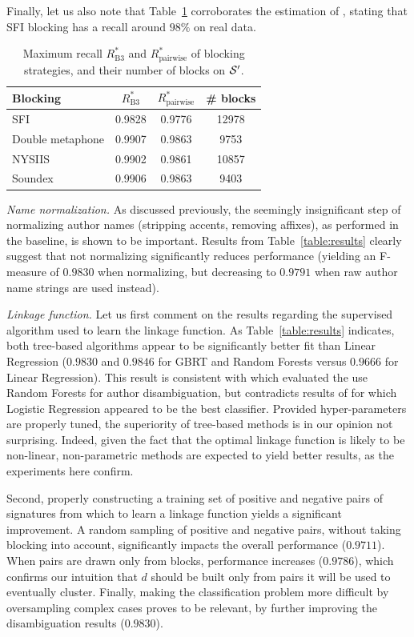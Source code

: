 \documentclass{article}
\begin{document}
Finally, let us also note that Table~\ref{table:blocking} corroborates the
estimation of \citep{torvik2009author}, stating that SFI blocking has a recall
around $98\%$ on real data.

\begin{table}
\caption{Maximum recall $R_\text{B3}^*$ and $R_\text{pairwise}^*$ of blocking strategies, and their number of blocks on ${\cal S}^\prime$.}
\label{table:blocking}
\centering
\begin{tabular}{|l|cc|c|}
  \hline
  \textbf{Blocking} & $R_\text{B3}^*$ & $R_\text{pairwise}^*$ & \# blocks \\
  \hline
  \hline
    SFI & 0.9828 & 0.9776 & 12978 \\
    Double metaphone & 0.9907 & 0.9863 & 9753 \\
    NYSIIS & 0.9902 & 0.9861 & 10857 \\
    Soundex & 0.9906 & 0.9863 & 9403 \\
  \hline
\end{tabular}
\end{table}

\textit{Name normalization.} As discussed previously, the seemingly insignificant step of
normalizing author names (stripping accents, removing affixes), as performed in the
baseline, is shown to be important. Results from Table~\ref{table:results} clearly suggest that not
normalizing significantly reduces performance (yielding an F-measure of $0.9830$ when normalizing,
but decreasing to $0.9791$ when raw author name strings are used instead).

\textit{Linkage function.} Let us first comment on the results regarding the
supervised algorithm used to learn the linkage function.
As Table~\ref{table:results} indicates, both tree-based algorithms appear to be
significantly better fit than Linear Regression ($0.9830$ and $0.9846$ for GBRT
and Random Forests versus $0.9666$ for Linear Regression). This result is
consistent with \citep{treeratpituk2009disambiguating} which evaluated the use
Random Forests for author disambiguation, but contradicts results of
\citep{levin2012citation} for which Logistic Regression appeared to be the best
classifier.
Provided hyper-parameters are properly tuned, the superiority of
tree-based methods is in our opinion not surprising.
Indeed, given the fact that the optimal linkage function is likely to be non-linear, non-parametric
methods are expected to yield better results, as the experiments here confirm.

Second, properly constructing a training set of positive and negative pairs of
signatures from which to learn a linkage function yields a significant
improvement.
A random sampling of positive and negative pairs, without taking
blocking into account, significantly impacts the overall performance
($0.9711$). When pairs are drawn only from blocks, performance increases
($0.9786$), which confirms our intuition that $d$ should be built only from
pairs it will be used to eventually cluster. Finally, making the classification
problem more difficult by oversampling complex cases proves to be relevant,
by further improving the disambiguation results ($0.9830$).
\end{document}
